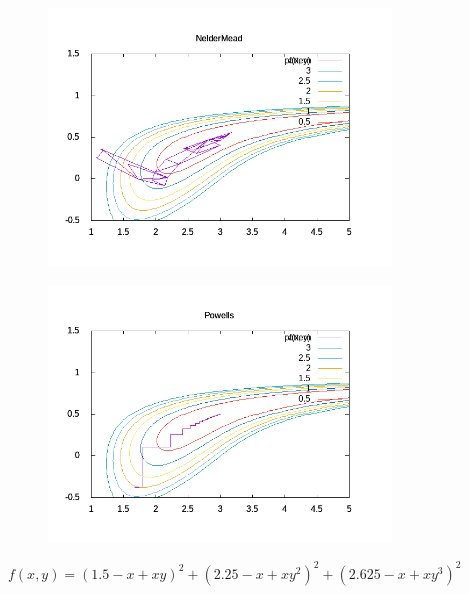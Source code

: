 \documentclass[12pt,letterpaper]{article}
\begin{document}
\begin{enumerate}
\begin{figure}
  \centering
  \begin{subfigure}[b]{0.45\textwidth}
    \centering
    \includegraphics[width=\textwidth]{figures/NelderMead_2.png}
  \end{subfigure}
  \hfill
  \begin{subfigure}[b]{0.45\textwidth}
    \centering
    \includegraphics[width=\textwidth]{figures/Powells_2.png}
  \end{subfigure}
    \caption{ $f(x, y)=(1.5-x+xy)^2 + (2.25-x+xy^2)^2 + (2.625 - x+ xy^3)^2$ }
\end{figure}

\end{enumerate}
\end{document}
